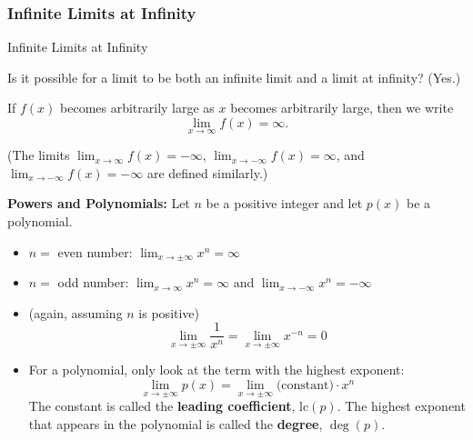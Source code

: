 \documentclass[Cal1Spr16Lectures.tex]{subfiles}
\begin{document}
\subsubsection{Infinite Limits at Infinity}
\begin{frame}{\small Infinite Limits at Infinity}\footnotesize
\begin{que} Is it possible for a limit to be both an infinite limit and a limit at infinity? (Yes.) \end{que}

\vspace{0.5pc}
If $f(x)$ becomes arbitrarily large as $x$ becomes arbitrarily large, then we write 
\[\displaystyle\lim_{x \to \infty}f(x)=\infty.\]  

\vspace{0.5pc}
(The limits 
$\displaystyle\lim_{x \to \infty}f(x)=-\infty$, $\displaystyle\lim_{x \to -\infty}f(x)=\infty$, and $\displaystyle\lim_{x \to -\infty} f(x)=-\infty$ are defined similarly.)
\end{frame}

\begin{frame}{}{}%
{\bf Powers and Polynomials:}  Let $n$ be a positive integer and let $p(x)$ be a polynomial.

\vspace{1pc}
\begin{itemize}
\item $n=$ even number: $\displaystyle\lim_{x\to\pm\infty}x^n=\infty$ 

\vspace{1pc}
\item $n=$ odd number: $\displaystyle\lim_{x \to \infty} x^n = \infty$ and $\displaystyle\lim_{x \to -\infty} x^n = -\infty$
\end{itemize}
\end{frame}

\begin{frame}\footnotesize
\begin{itemize}
\item (again, assuming $n$ is positive)
\[\lim_{x\to\pm\infty}\frac{1}{x^n}=\lim_{x\to\pm\infty}x^{-n}=0\]

\item For a polynomial, only look at the term with the highest exponent:
\[\lim_{x\to\pm\infty}p(x)=\lim_{x\to\pm\infty}\text{(constant)}\cdot x^n\] 
The constant is called the {\bf leading coefficient}, lc$(p)$.  The highest exponent that appears in the polynomial is called the {\bf degree}, $\deg(p)$.
\end{itemize}
\end{frame}
\end{document}
